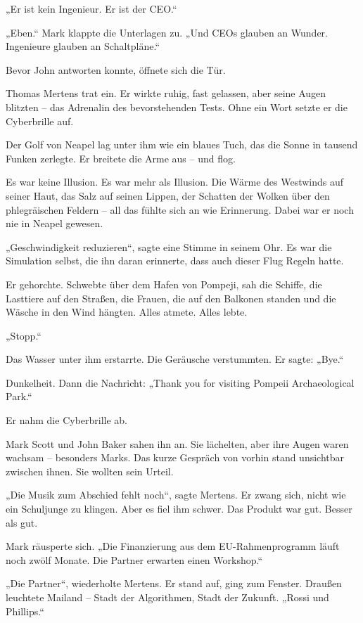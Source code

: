 \documentclass[
]{article}
\begin{document}
„Er ist kein Ingenieur. Er ist der CEO.``

„Eben.`` Mark klappte die Unterlagen zu. „Und CEOs glauben an Wunder. Ingenieure glauben an Schaltpläne.``

Bevor John antworten konnte, öffnete sich die Tür.

Thomas Mertens trat ein. Er wirkte ruhig, fast gelassen, aber seine Augen blitzten -- das Adrenalin des bevorstehenden Tests. Ohne ein Wort setzte er die Cyberbrille auf.

Der Golf von Neapel lag unter ihm wie ein blaues Tuch, das die Sonne in tausend Funken zerlegte. Er breitete die Arme aus -- und flog.

Es war keine Illusion. Es war mehr als Illusion. Die Wärme des Westwinds auf seiner Haut, das Salz auf seinen Lippen, der Schatten der Wolken über den phlegräischen Feldern -- all das fühlte sich an wie Erinnerung. Dabei war er noch nie in Neapel gewesen.

„Geschwindigkeit reduzieren``, sagte eine Stimme in seinem Ohr. Es war die Simulation selbst, die ihn daran erinnerte, dass auch dieser Flug Regeln hatte.

Er gehorchte. Schwebte über dem Hafen von Pompeji, sah die Schiffe, die Lasttiere auf den Straßen, die Frauen, die auf den Balkonen standen und die Wäsche in den Wind hängten. Alles atmete. Alles lebte.

„Stopp.``

Das Wasser unter ihm erstarrte. Die Geräusche verstummten. Er sagte: „Bye.``

Dunkelheit. Dann die Nachricht: „Thank you for visiting Pompeii Archaeological Park.``

Er nahm die Cyberbrille ab.

Mark Scott und John Baker sahen ihn an. Sie lächelten, aber ihre Augen waren wachsam -- besonders Marks. Das kurze Gespräch von vorhin stand unsichtbar zwischen ihnen. Sie wollten sein Urteil.

„Die Musik zum Abschied fehlt noch``, sagte Mertens. Er zwang sich, nicht wie ein Schuljunge zu klingen. Aber es fiel ihm schwer. Das Produkt war gut. Besser als gut.

Mark räusperte sich. „Die Finanzierung aus dem EU-Rahmenprogramm läuft noch zwölf Monate. Die Partner erwarten einen Workshop.``

„Die Partner``, wiederholte Mertens. Er stand auf, ging zum Fenster. Draußen leuchtete Mailand -- Stadt der Algorithmen, Stadt der Zukunft. „Rossi und Phillips.``
\end{document}
